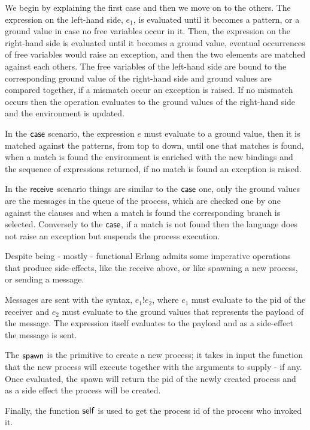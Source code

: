 \documentclass{article}[12pt,a4paper]
\theoremstyle{definition}
\begin{document}
We begin by explaining the first case and then we move on to the others.
The expression on the left-hand side, $e_1$, is evaluated until it becomes a
pattern, or a ground value in case no free variables occur in it. Then, the
expression on the right-hand side is evaluated until it becomes a ground value,
eventual occurrences of free variables would raise an exception, and then the
two elements are matched against each others. The free variables of the
left-hand side are bound to the corresponding ground value of the right-hand
side and ground values are compared together, if a mismatch occur an exception
is raised. If no mismatch occurs then the operation evaluates to the ground
values of the right-hand side and the environment is updated.

In the $\mathsf{case}$ scenario, the expression $e$ must evaluate to a ground value, then it is matched against the patterns, from
top to down, until one that matches is found, when a match is found the environment
is enriched with the new bindings and the sequence of expressions returned, if
no match is found an exception is raised.

In the $\mathsf{receive}$ scenario things are similar to the $\mathsf{case}$ one, only the
ground values are the messages in the queue of the process, which are checked
one by one against the clauses and when a match is found the corresponding branch is selected.
Conversely to the $\mathsf{case}$, if a match is not found then the language
does not raise an exception but suspends the process execution.

Despite being - mostly - functional Erlang
admits some imperative operations that produce side-effects, like the receive
above, or like spawning a new process, or sending a message. 

Messages are sent with the syntax, $e_1!e_2$, where $e_1$ must
evaluate to the pid of the receiver and $e_2$ must evaluate to the ground values
that represents the payload of the message. The expression itself evaluates to
the payload and as a side-effect the message is sent.

The $\mathsf{spawn}$ is the primitive to create a new process; it takes in input the
function that the new process will execute together with the arguments to supply
- if any. Once evaluated, the spawn will return the pid of the newly created
process and as a side effect the process will be created.

Finally, the function $\mathsf{self}$ is used to get the process id of the process
who invoked it.
\end{document}
